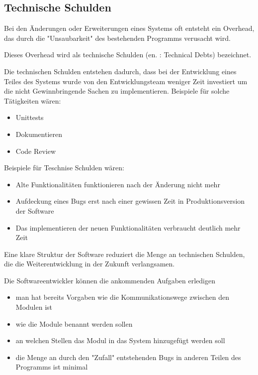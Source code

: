 \documentclass{article}
\begin{document}
    \subsection{Technische Schulden}
    Bei den Änderungen oder Erweiterungen eines Systems oft entsteht ein Overhead, das durch die "Unsaubarkeit" des bestehenden Programms verusacht wird.

    Dieses Overhead wird als technische Schulden (en. : Technical Debts) bezeichnet.

    Die technischen Schulden entstehen dadurch, dass bei der Entwicklung eines Teiles des Systems wurde 
    von den Entwicklungsteam weniger Zeit investiert um die nicht Gewinnbringende Sachen zu implementieren.
    Beispiele für solche Tätigkeiten wären:
    \begin{itemize}
        \item Unittests
        \item Dokumentieren 
        \item Code Review
    \end{itemize}

    Beispiele für Teschnise Schulden wären:
    \begin{itemize}
        \item Alte Funktionalitäten funktionieren nach der Änderung nicht mehr
        \item Aufdeckung eines Bugs erst nach einer gewissen Zeit in Produktionsversion der Software
        \item Das implementieren der neuen Funktionalitäten verbraucht deutlich mehr Zeit
    \end{itemize}

    Eine klare Struktur der Software reduziert die Menge an technischen Schulden, 
    die die Weiterentwicklung in der Zukunft verlangsamen. 

    Die Softwareentwickler können die ankommenden Aufgaben erledigen
    \begin{itemize}
        \item man hat bereits Vorgaben wie die Kommunikationswege zwischen den Modulen ist
        \item wie die Module benannt werden sollen
        \item an welchen Stellen das Modul in das System hinzugefügt werden soll
        \item die Menge an durch den "Zufall" entstehenden Bugs in anderen Teilen des Programms ist minimal
    \end{itemize}
\end{document}
